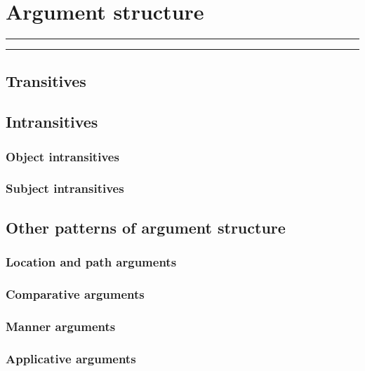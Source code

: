 
\resetexcnt
\chapter{Argument structure}\label{ch:argstr}

\startcontents[chapters]
\noindent\rule[0.5em]{\textwidth}{\heavyrulewidth}
\noindent\rule{\textwidth}{\heavyrulewidth}
\vspace{1\baselineskip}


\section{Transitives}\label{sec:argstr-trans}

\section{Intransitives}\label{sec:argstr-intrans}

\subsection{Object intransitives}\label{sec:argstr-intrans-obj}

\subsection{Subject intransitives}\label{sec:argstr-intrans-subj}

\section{Other patterns of argument structure}\label{sec:argstr-other}

\subsection{Location and path arguments}\label{sec:argstr-other-locpath}

\subsection{Comparative arguments}\label{sec:argstr-other-cmpv}

\subsection{Manner arguments}\label{sec:argstr-other-manner}

\subsection{Applicative arguments}\label{sec:argstr-other-appl}

\stopcontents[chapters]
